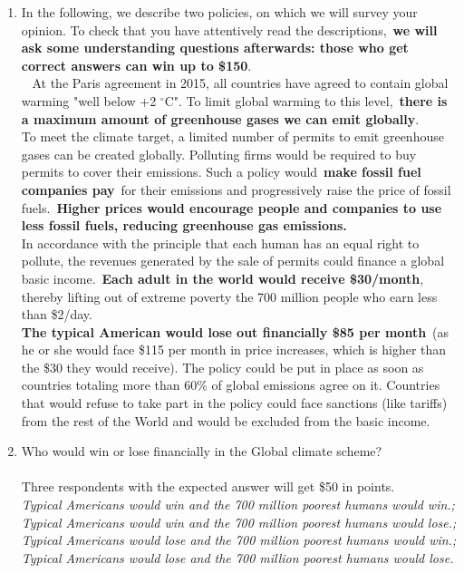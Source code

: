 \begin{enumerate}[resume] \item In the following, we describe two policies, on which we will survey your opinion. To check that you have attentively read the descriptions,~\textbf{we will ask some understanding questions afterwards: those who get correct answers can win up to \$150}. \\
\textbf{}~ At the Paris agreement in 2015, all countries have agreed to contain global warming "well below +2 $\mathrm{{}^\circ}$C". To limit global warming to this level,~\textbf{there is a maximum amount of greenhouse gases we can emit globally}.\\
To meet the climate target, a limited number of permits to emit greenhouse gases can be created globally. Polluting firms would be required to buy permits to cover their emissions. Such a policy would~\textbf{make fossil fuel companies pay}~for their emissions and progressively raise the price of fossil fuels.~\textbf{Higher prices would encourage people and companies to use less fossil fuels, reducing greenhouse gas emissions.}\\
In accordance with the principle that each human has an equal right to pollute, the revenues generated by the sale of permits could finance a global basic income.~\textbf{Each adult in the world would receive \$30/month}, thereby lifting out of extreme poverty the 700 million people who earn less than \$2/day.\\
\textbf{The typical American would lose out financially \$85 per month}~(as he or she would face \$115 per month in price increases, which is higher than the \$30 they would receive). The policy could be put in place as soon as countries totaling more than 60\% of global emissions agree on it. Countries that would refuse to take part in the policy could face sanctions (like tariffs) from the rest of the World and would be excluded from the basic income.
\item Who would win or lose financially in the Global climate scheme? \\
\\
Three respondents with the expected answer will get \$50 in points.
\\ \textit{Typical Americans would win and the 700 million poorest humans would win.; Typical Americans would win and the 700 million poorest humans would lose.; Typical Americans would lose and the 700 million poorest humans would win.; Typical Americans would lose and the 700 million poorest humans would lose.}

\end{enumerate}
